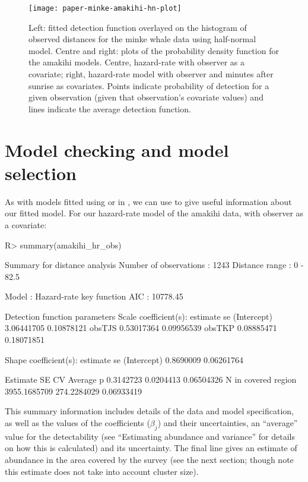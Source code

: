 \documentclass[article]{jss}
\begin{document}
\begin{figure}
\begin{center}
\texttt{[image: paper-minke-amakihi-hn-plot]}
\caption{Left: fitted detection function overlayed on the histogram of observed distances for the minke whale data using half-normal model. Centre and right: plots of the probability density function for the amakihi models. Centre, hazard-rate with observer as a covariate; right, hazard-rate model with observer and minutes after sunrise as covariates. Points indicate probability of detection for a given observation (given that observation's covariate values) and lines indicate the average detection function.}
\label{fig:minkeamakihi}
\end{center}
\end{figure}

\section{Model checking and model selection}

As with models fitted using  or  in , we can use  to give useful information about our fitted model. For our hazard-rate model of the amakihi data, with observer as a covariate:
\begin{Schunk}
\begin{Sinput}
R> summary(amakihi_hr_obs)
\end{Sinput}
\begin{Soutput}
Summary for distance analysis 
Number of observations :  1243 
Distance range         :  0  -  82.5 

Model : Hazard-rate key function 
AIC   : 10778.45 

Detection function parameters
Scale coefficient(s):  
              estimate         se
(Intercept) 3.06441705 0.10878121
obsTJS      0.53017364 0.09956539
obsTKP      0.08885471 0.18071851

Shape coefficient(s):  
             estimate         se
(Intercept) 0.8690009 0.06261764

                        Estimate          SE         CV
Average p              0.3142723   0.0204413 0.06504326
N in covered region 3955.1685709 274.2284029 0.06933419
\end{Soutput}
\end{Schunk}
This summary information includes details of the data and model specification, as well as the values of the coefficients ($\beta_j$) and their uncertainties, an ``average'' value for the detectability (see ``Estimating abundance and variance'' for details on how this is calculated) and its uncertainty. The final line gives an estimate of abundance in the area covered by the survey (see the next section; though note this estimate does not take into account cluster size).
\end{document}
